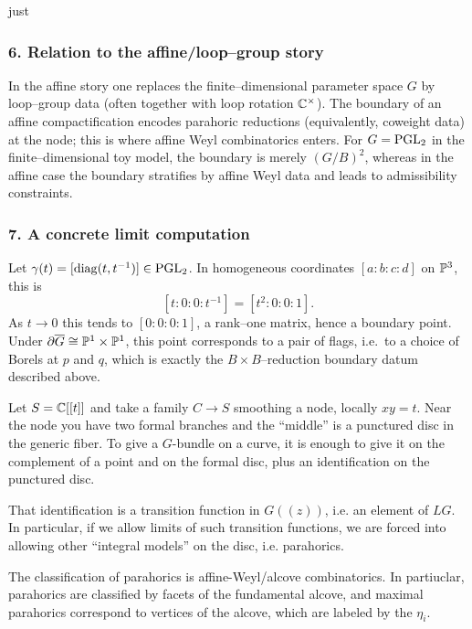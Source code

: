 just \documentclass[12pt]{article}
\begin{document}
\subsubsection*{6. Relation to the affine/loop--group story}

In the affine story one replaces the finite--dimensional parameter space $G$ by
loop--group data (often together with loop rotation $\C^\times$).  The boundary
of an affine compactification encodes parahoric reductions (equivalently,
coweight data) at the node; this is where affine Weyl combinatorics enters.
For $G=\PGL_2$ in the finite--dimensional toy model, the boundary is merely
$(G/B)^2$, whereas in the affine case the boundary stratifies by affine Weyl
data and leads to admissibility constraints.

\subsubsection*{7. A concrete limit computation}

Let $\gamma(t)=[\diag(t,t^{-1})]\in \PGL_2$.  In homogeneous coordinates
$[a:b:c:d]$ on $\P^3$, this is
\[
[t:0:0:t^{-1}] = [t^2:0:0:1].
\]
As $t\to 0$ this tends to $[0:0:0:1]$, a rank--one matrix, hence a boundary point.
Under $\partial\overline G\cong \P^1\times \P^1$, this point corresponds to a
pair of flags, i.e.\ to a choice of Borels at $p$ and $q$, which is exactly the
$B\times B$--reduction boundary datum described above.

Let $S=\C[[t]]$ and take a family $C\to S$ smoothing a node, locally $xy=t$. Near the node you have two formal branches and the “middle” is a punctured disc in the generic fiber.
To give a $G$-bundle on a curve, it is enough to give it on the complement of a point and on the formal disc, plus an identification on the punctured disc.

That identification is a transition function in $G(\!(z)\!)$, i.e. an element of $LG$. In particular, if we allow limits of such transition functions, we are forced into allowing other “integral models” on the disc, i.e. parahorics. 

The classification of parahorics is affine-Weyl/alcove combinatorics. In partiuclar, parahorics are classified by facets of the fundamental alcove, and maximal parahorics correspond to vertices of the alcove, which are labeled by the $\eta_i$.
\end{document}
